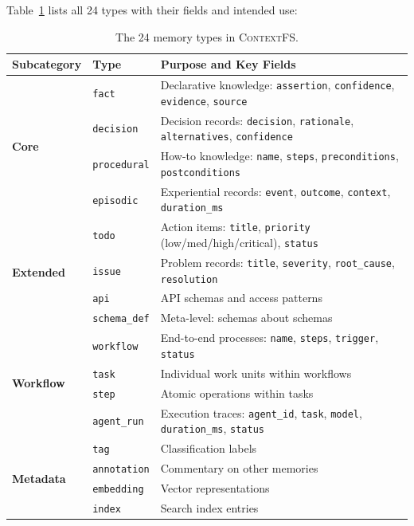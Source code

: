 \documentclass[12pt,a4paper]{article}
\theoremstyle{definition}
\newcommand{\ContextFS}{\textsc{ContextFS}}
\begin{document}
Table~\ref{tab:memory-types} lists all 24 types with their fields and intended use:

\begin{table}[H]
\centering
\caption{The 24 memory types in \ContextFS{}.}
\label{tab:memory-types}
\begin{tabularx}{\textwidth}{llX}
\toprule
\textbf{Subcategory} & \textbf{Type} & \textbf{Purpose and Key Fields} \\
\midrule
\multirow{4}{*}{\textbf{Core}} & \texttt{fact} & Declarative knowledge: \texttt{assertion}, \texttt{confidence}, \texttt{evidence}, \texttt{source} \\
  & \texttt{decision} & Decision records: \texttt{decision}, \texttt{rationale}, \texttt{alternatives}, \texttt{confidence} \\
  & \texttt{procedural} & How-to knowledge: \texttt{name}, \texttt{steps}, \texttt{preconditions}, \texttt{postconditions} \\
  & \texttt{episodic} & Experiential records: \texttt{event}, \texttt{outcome}, \texttt{context}, \texttt{duration\_ms} \\
\midrule
\multirow{4}{*}{\textbf{Extended}} & \texttt{todo} & Action items: \texttt{title}, \texttt{priority} (low/med/high/critical), \texttt{status} \\
  & \texttt{issue} & Problem records: \texttt{title}, \texttt{severity}, \texttt{root\_cause}, \texttt{resolution} \\
  & \texttt{api} & API schemas and access patterns \\
  & \texttt{schema\_def} & Meta-level: schemas about schemas \\
\midrule
\multirow{4}{*}{\textbf{Workflow}} & \texttt{workflow} & End-to-end processes: \texttt{name}, \texttt{steps}, \texttt{trigger}, \texttt{status} \\
  & \texttt{task} & Individual work units within workflows \\
  & \texttt{step} & Atomic operations within tasks \\
  & \texttt{agent\_run} & Execution traces: \texttt{agent\_id}, \texttt{task}, \texttt{model}, \texttt{duration\_ms}, \texttt{status} \\
\midrule
\multirow{4}{*}{\textbf{Metadata}} & \texttt{tag} & Classification labels \\
  & \texttt{annotation} & Commentary on other memories \\
  & \texttt{embedding} & Vector representations \\
  & \texttt{index} & Search index entries \\

\end{tabularx}
\end{table}
\end{document}
